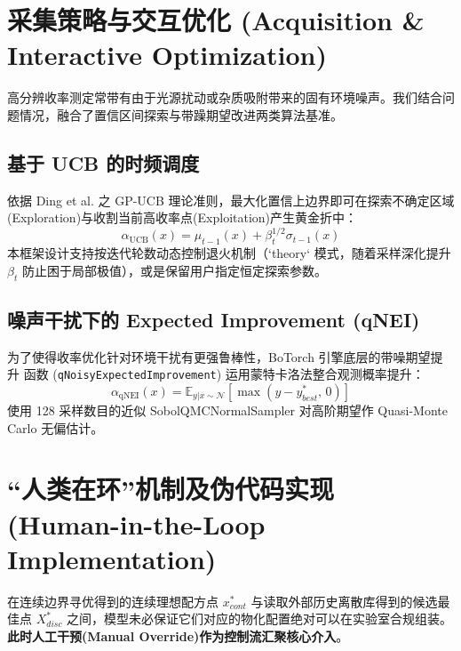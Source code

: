 \documentclass[12pt,a4paper]{article}
\begin{document}
\section{采集策略与交互优化 (Acquisition \& Interactive Optimization)}

高分辨收率测定常带有由于光源扰动或杂质吸附带来的固有环境噪声。我们结合问题情况，融合了置信区间探索与带躁期望改进两类算法基准。

\subsection{基于 UCB 的时频调度}
依据 Ding et al.\cite{gpucb2026} 之 GP-UCB 理论准则，最大化置信上边界即可在探索不确定区域(Exploration)与收割当前高收率点(Exploitation)产生黄金折中：
\begin{equation}
    \alpha_{\text{UCB}}(x) = \mu_{t-1}(x) + \beta_t^{1/2} \sigma_{t-1}(x)
\end{equation}
本框架设计支持按迭代轮数动态控制退火机制（`theory` 模式，随着采样深化提升 $\beta_t$ 防止困于局部极值），或是保留用户指定恒定探索参数。

\subsection{噪声干扰下的 Expected Improvement (qNEI)}
为了使得收率优化针对环境干扰有更强鲁棒性\cite{cbo2017}，BoTorch 引擎底层的带噪期望提升
函数 (\texttt{qNoisyExpectedImprovement}) 运用蒙特卡洛法整合观测概率提升：
\begin{equation}
    \alpha_{\text{qNEI}}(x) = \mathbb{E}_{y|x \sim \mathcal{N}}\left[ \max(y - y_{best}^*,\, 0) \right]
\end{equation}
使用 128 采样数目的近似 SobolQMCNormalSampler 对高阶期望作 Quasi-Monte Carlo 无偏估计\cite{botorch2019}。



\section{“人类在环”机制及伪代码实现 (Human-in-the-Loop Implementation)}

在连续边界寻优得到的连续理想配方点 $x^*_{cont}$ 与读取外部历史离散库得到的候选最佳点 $X^*_{disc}$ 之间，模型未必保证它们对应的物化配置绝对可以在实验室合规组装。\textbf{此时人工干预(Manual Override)作为控制流汇聚核心介入}。
\end{document}
